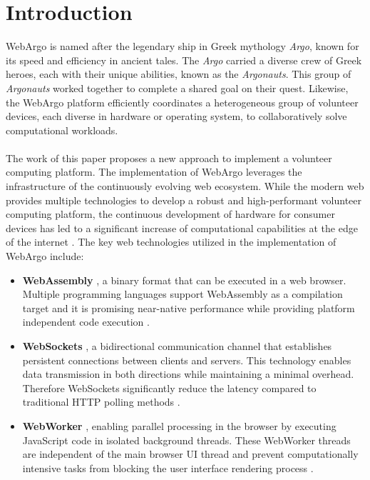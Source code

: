 \chapter{Introduction}
\label{ch:intro}
WebArgo is named after the legendary ship in Greek mythology \emph{Argo}, known for its speed and efficiency in ancient tales. The \emph{Argo} carried a diverse crew of Greek heroes, each with their unique abilities, known as the \emph{Argonauts}. This group of \emph{Argonauts} worked together to complete a shared goal on their quest. Likewise, the WebArgo platform efficiently coordinates a heterogeneous group of volunteer devices, each diverse in hardware or operating system, to collaboratively solve computational workloads.
\\~\\
The work of this paper proposes a new approach to implement a volunteer computing platform. The implementation of WebArgo leverages the infrastructure of the continuously evolving web ecosystem. While the modern web provides multiple technologies to develop a robust and high-performant volunteer computing platform, the continuous development of hardware for consumer devices has led to a significant increase of computational capabilities at the edge of the internet \cite{relatedwork:mobilecloud, relatedwork:wasmedgecomputing}. The key web technologies utilized in the implementation of WebArgo include:
\begin{itemize}
    \item \textbf{WebAssembly} \cite{methodology:wasmW3C}, a binary format that can be executed in a web browser. Multiple programming languages support WebAssembly as a compilation target and it is promising near-native performance while providing platform independent code execution \cite{methodology:wasm, methodology:wasmW3C}.
    \item \textbf{WebSockets} \cite{methodology:websockets1}, a bidirectional communication channel that establishes persistent connections between clients and servers. This technology enables data transmission in both directions while maintaining a minimal overhead. Therefore WebSockets significantly reduce the latency compared to traditional \acs{HTTP} polling methods \cite{methodology:websockets3}. 
    \item \textbf{WebWorker} \cite{methodology:webworkers}, enabling parallel processing in the browser by executing JavaScript code in isolated background threads. These WebWorker threads are independent of the main browser UI thread and prevent computationally intensive tasks from blocking the user interface rendering process \cite{methodology:webworkers}.
\end{itemize}
